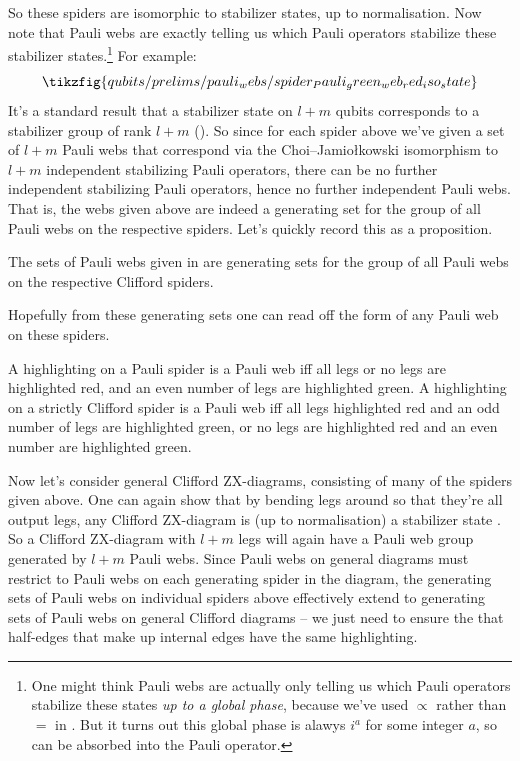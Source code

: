 So these spiders are isomorphic to stabilizer states, up to normalisation.
Now note that Pauli webs are exactly telling us which Pauli operators stabilize these stabilizer states.\footnote{One might think Pauli webs are actually only telling us which Pauli operators stabilize these states \textit{up to a global phase}, because we've used $\propto$ rather than $=$ in . But it turns out this global phase is alawys $i^a$ for some integer $a$, so can be absorbed into the Pauli operator.}
For example:
\begin{equation}\label{eq:spider_Pauli_green_web_red_iso_state}
    \tikzfig{qubits/prelims/pauli_webs/spider_Pauli_green_web_red_iso_state}
\end{equation}
It's a standard result that a stabilizer state on $l+m$ qubits corresponds to a stabilizer group of rank $l+m$ ().
So since for each spider above we've given a set of $l+m$ Pauli webs that correspond via the Choi–Jamiołkowski isomorphism to $l+m$ independent stabilizing Pauli operators, there can be no further independent stabilizing Pauli operators, hence no further independent Pauli webs.
That is, the webs given above are indeed a generating set for the group of all Pauli webs on the respective spiders.
Let's quickly record this as a proposition.
\begin{proposition}
    The sets of Pauli webs given in  are generating sets for the group of all Pauli webs on the respective Clifford spiders.
\end{proposition}

Hopefully from these generating sets one can read off the form of any Pauli web on these spiders.

\begin{proposition}
    A highlighting on a Pauli spider is a Pauli web iff all legs or no legs are highlighted red, and an even number of legs are highlighted green.
    A highlighting on a strictly Clifford spider is a Pauli web iff all legs highlighted red and an odd number of legs are highlighted green, or no legs are highlighted red and an even number are highlighted green.
\end{proposition}

Now let's consider general Clifford ZX-diagrams, consisting of many of the spiders given above.
One can again show that by bending legs around so that they're all output legs, any Clifford ZX-diagram is (up to normalisation) a stabilizer state .
So a Clifford ZX-diagram with $l+m$ legs will again have a Pauli web group generated by $l+m$ Pauli webs.
Since Pauli webs on general diagrams must restrict to Pauli webs on each generating spider in the diagram, the generating sets of Pauli webs on individual spiders above effectively extend to generating sets of Pauli webs on general Clifford diagrams -- we just need to ensure the that half-edges that make up internal edges have the same highlighting.

